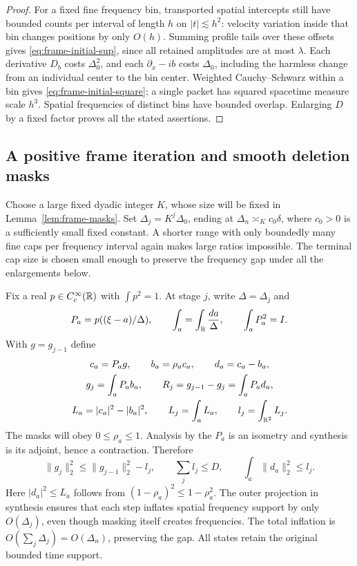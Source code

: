 \begin{proof}
For a fixed fine frequency bin, transported spatial intercepts still
have bounded counts per interval of length $h$ on $|t|\lesssim h^2$:
velocity variation inside that bin changes positions by only $O(h)$.
Summing profile tails over these offsets gives
\eqref{eq:frame-initial-sup}, since all retained amplitudes are at most
$\lambda$.  Each derivative $D_b$ costs $\Delta_0^2$, and each
$\partial_x-ib$ costs $\Delta_0$, including the harmless change from
an individual center to the bin center.  Weighted Cauchy--Schwarz
within a bin gives \eqref{eq:frame-initial-square}; a single packet
has squared spacetime measure scale $h^3$.  Spatial frequencies of
distinct bins have bounded overlap.  Enlarging $D$ by a fixed factor
proves all the stated assertions.
\end{proof}

\subsection{A positive frame iteration and smooth deletion masks}

Choose a large fixed dyadic integer $K$, whose size will be fixed in
Lemma~\ref{lem:frame-masks}.  Set $\Delta_j=K^j\Delta_0$, ending at
$\Delta_n\asymp_K c_0\delta$, where $c_0>0$ is a sufficiently small
fixed constant.  A shorter range with only boundedly many fine caps
per frequency interval again makes large ratios impossible.  The
terminal cap size is chosen small enough to preserve the frequency
gap under all the enlargements below.

Fix a real $p\in C_c^\infty(\mathbb R)$ with $\int p^2=1$.  At stage $j$,
write $\Delta=\Delta_j$ and
\[
 P_a=p((\xi-a)/\Delta),\qquad
 \int_a=\int_\mathbb R\frac{da}{\Delta},\qquad
 \int_aP_a^2=I.
\]
With $g=g_{j-1}$ define
\begin{equation}\label{eq:frame-step}
 \begin{gathered}
 c_a=P_ag,\qquad b_a=\rho_ac_a,\qquad d_a=c_a-b_a,\\
 g_j=\int_aP_ab_a,\qquad R_j=g_{j-1}-g_j=\int_aP_ad_a,\\
 L_a=|c_a|^2-|b_a|^2,\qquad
 L_j=\int_aL_a,\qquad l_j=\int_{\mathbb R^2}L_j.
 \end{gathered}
\end{equation}
The masks will obey $0\leq\rho_a\leq1$.  Analysis by the $P_a$ is an
isometry and synthesis is its adjoint, hence a contraction.  Therefore
\begin{equation}\label{eq:frame-contraction}
 \|g_j\|_2^2\leq\|g_{j-1}\|_2^2-l_j,\qquad
 \sum_jl_j\leq D,\qquad
 \int_a\|d_a\|_2^2\leq l_j.
\end{equation}
Here $|d_a|^2\leq L_a$ follows from
$(1-\rho_a)^2\leq1-\rho_a^2$.
The outer projection in synthesis ensures that each step inflates
spatial frequency support by only $O(\Delta_j)$, even though masking
itself creates frequencies.  The total inflation is
$O(\sum_j\Delta_j)=O(\Delta_n)$, preserving the gap.
All states retain the original bounded time support.

